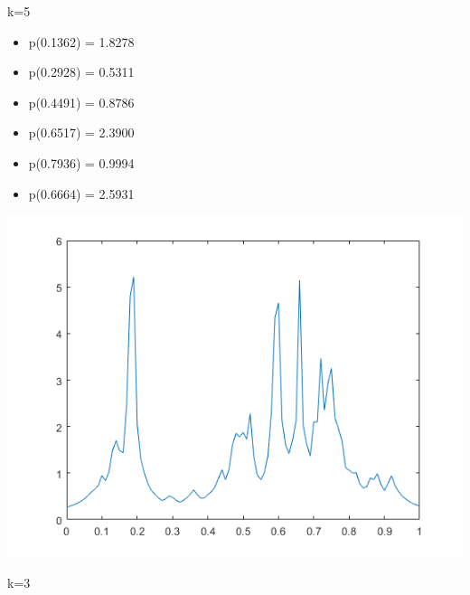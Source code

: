 \documentclass[a4paper]{article}
\begin{document}
k=5
\begin{itemize}
    \item p(0.1362) = 1.8278
    \item p(0.2928) = 0.5311
    \item p(0.4491) = 0.8786
    \item p(0.6517) = 2.3900
    \item p(0.7936) = 0.9994
    \item p(0.6664) = 2.5931
\end{itemize}

\begin{center}
    \includegraphics[scale=1]{3-3b.png}
    \caption{k=3}
\end{center}
\end{document}
